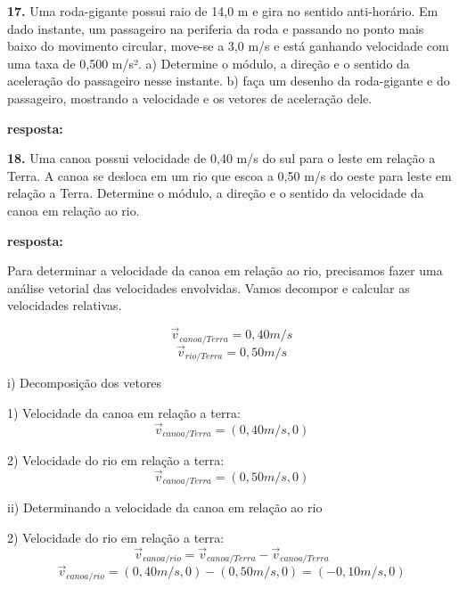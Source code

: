 \documentclass[a4paper, 12pt]{article}
\begin{document}
\begin{flushleft}
		\vspace{2em}
		
		\textbf{17.}  Uma roda-gigante possui raio de 14,0 m e gira no sentido anti-horário. Em dado instante, um passageiro na periferia da roda e passando no ponto mais baixo do movimento circular, move-se a 3,0 m/s e está ganhando velocidade com uma taxa de 0,500 m/s². a) Determine o módulo, a direção e o sentido da aceleração do passageiro nesse instante. b) faça um desenho da roda-gigante e do passageiro, mostrando a velocidade e os vetores de aceleração dele.
		
		\textbf{resposta:}
		
		\vspace{2em}
		
		\textbf{18.}  Uma canoa possui velocidade de 0,40 m/s do sul para o leste em relação a Terra. A canoa se desloca em um rio que escoa a 0,50 m/s do oeste para leste em relação a Terra. Determine o módulo, a direção e o sentido da velocidade da canoa em relação ao rio.
		
		\textbf{resposta:}
		
		Para determinar a velocidade da canoa em relação ao rio, precisamos fazer uma análise vetorial das velocidades envolvidas. Vamos decompor e calcular as velocidades relativas.
		
		\begin{equation*}
			\vec{v}_{canoa/Terra} = 0,40m/s
		\end{equation*}
		\begin{equation*}
			\vec{v}_{rio/Terra} = 0,50m/s
		\end{equation*}
		
		i) Decomposição dos vetores
		
		1) Velocidade da canoa em relação a terra:
		\begin{equation*}
			\vec{v}_{canoa/Terra} = (0,40m/s, 0)
		\end{equation*}
		
		2) Velocidade do rio em relação a terra:
		\begin{equation*}
			\vec{v}_{canoa/Terra} = (0,50m/s, 0)
		\end{equation*}
		
		ii) Determinando a velocidade da canoa em relação ao rio
		
		2) Velocidade do rio em relação a terra:
		\begin{equation*}
			\vec{v}_{canoa/rio} = \vec{v}_{canoa/Terra} - \vec{v}_{canoa/Terra}
		\end{equation*}
		\begin{equation*}
			\vec{v}_{canoa/rio} = (0,40m/s, 0) - (0,50m/s, 0) = (-0,10m/s,0)
		\end{equation*}
		

\end{flushleft}
\end{document}
